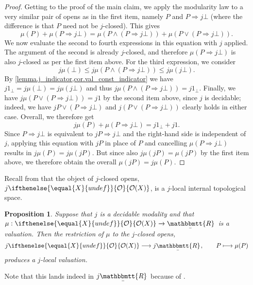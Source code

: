 \documentclass[reqno,11pt]{amsproc}
\theoremstyle{plain}
\newtheorem{proposition}[theorem]{Proposition}
\theoremstyle{definition}
\renewcommand{\to}[1][]{\xrightarrow{#1}}
\newcommand{\ubar}[1]{\underaccent{\bar}{#1}}
\newcommand{\ind}[1]{1_{#1}}			%
\newcommand{\internal}[1]{\raisebox{-.03ex}{$\mathbbmtt{#1}$}}
\newcommand{\hs}{\hspace{1pt}}
\newcommand{\trr}{\internal{R}}
\newcommand{\tlrr}{\ubar{\trr}\hs}
\newcommand{\Op}[1][undef]{\ifthenelse{\equal{#1}{undef}}{\mathcal{O}}{\mathcal{O}(#1)}}
\newcommand{\imp}{\Rightarrow}
\numberwithin{equation}{section}
\begin{document}
\begin{proof}
	Getting to the proof of the main claim, we apply the modularity law to a very similar pair of opens as in the first item, namely $P$ and $P \Rightarrow j\bot$ (where the difference is that $P$ need not be $j$-closed). This gives
	\[
		\mu(P) + \mu(P \Rightarrow j\bot) = \mu(P \land (P \Rightarrow j\bot)) + \mu(P \lor (P \Rightarrow j\bot)).
	\]
	We now evaluate the second to fourth expressions in this equation with $j$ applied. The argument of the second is already $j$-closed, and therefore $\mu(P \Rightarrow j\bot)$ is also $j$-closed as per the first item above. For the third expression, we consider
	\[
		j \mu(\bot) \le j \mu(P \land (P \Rightarrow j\bot)) \le j \mu(j\bot).
	\]
	By \cref{lemma.j_indicator,cor.val_const_indicator} we have $j \ind{\bot}=j \mu(\bot)=j\mu(j\bot)$ and thus $j \mu(P \land (P \Rightarrow j\bot)) =  j \ind{\bot}$. Finally, we have $j \mu(P \lor (P \Rightarrow j\bot)) = j 1$ by the second item above, since $j$ is decidable; indeed, we have $jP\lor(P\imp j\bot)$ and $j(P \lor (P \Rightarrow j\bot))$ clearly holds in either case. Overall, we therefore get
	\[
		j \mu(P) + \mu(P \Rightarrow j\bot) = j \ind{\bot} + j 1.
	\]
	Since $P \Rightarrow j\bot$ is equivalent to $jP \Rightarrow j\bot$ and the right-hand side is independent of $j$, applying this equation with $jP$ in place of $P$ and cancelling $\mu(P \Rightarrow j\bot)$ results in $j \mu(P) = j \mu(jP)$. But since also $j \mu(jP) = \mu(jP)$ by the first item above, we therefore obtain the overall $\mu(jP) = j \mu(P)$.
\end{proof}

Recall from  that the object of $j$-closed opens, $j \Op[X]$, is a $j$-local internal topological space.

\begin{proposition}
	\label{val_localize}
	Suppose that $j$ is a decidable modality and that $\mu : \Op[X] \to \tlrr$ is a valuation. Then the restriction of $\mu$ to the $j$-closed opens,
	\[
		j \Op[X] \longrightarrow j \tlrr, \qquad P \longmapsto \mu(P)
	\]
	produces a $j$-local valuation.
\end{proposition}

Note that this lands indeed in $j \tlrr$ because of .
\end{document}
